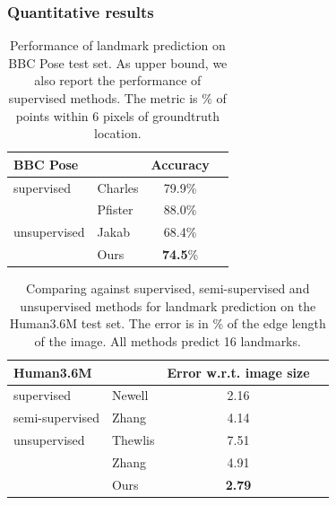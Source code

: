 		\subsubsection{Quantitative results}
			\begin{table}[htp]
				\caption{{
				Performance of landmark prediction on BBC Pose test set. As upper bound, we also report the performance of supervised methods.
				The metric is \% of points within 6 pixels of groundtruth location. %
				}}
				\label{tab:bbcpose}
				\centering
				\begin{tabular}{ll|cr}
				\hline
				BBC Pose &   &    { Accuracy}  \\
				 \hline
				supervised & Charles \cite{charles13bbcpose} &
				   79.9\%  \\ %
				 & Pfister \cite{pfister15flowingconv}  &
				  88.0\%  \\ \hline %
				unsupervised &Jakab \cite{jakab18} &
				 68.4\%  \\  %
				  &Ours &  \textbf{74.5}\% \\
				\hline
				\end{tabular}
			\end{table}

			\begin{table}[htp]
				\caption{{Comparing against supervised, semi-supervised and unsupervised methods for landmark prediction on the Human3.6M test set. The
				error is in \% of the edge length of the image. All methods predict 16 landmarks.
				}}
				\label{tab:human}
				\centering
				\begin{tabular}{ll|cr}
				\hline
				 Human3.6M   & &  { Error w.r.t. image size}  \\
				 \hline
				 supervised & Newell \cite{newell16hourglass}
				  &2.16  \\  \hline
				 semi-supervised & Zhang \cite{zhang18}
				  & 4.14  \\ \hline
				 unsupervised & Thewlis \cite{thewlis17}
				 & 7.51  \\
				  & Zhang \cite{zhang18}
					& 4.91 \\
				  & Ours& \textbf{2.79} \\
				\hline
				\end{tabular}
			\end{table}


